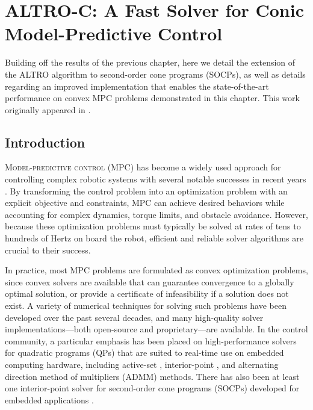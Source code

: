 \documentclass[../root.tex]{subfiles}
\begin{document}
\chapter{ALTRO-C: A Fast Solver for Conic Model-Predictive Control} \label{chap:altro_c}
Building off the results of the previous chapter, here we detail the extension of the
ALTRO algorithm to second-order cone programs (SOCPs), as well as details regarding
an improved implementation that enables the state-of-the-art performance on convex 
MPC problems demonstrated in this chapter. 
This work originally appeared in \cite{jackson_ALTROC_2021}.

\section{Introduction}
    \lettrine{M}{odel-predictive control} 
    (MPC) has become a widely used approach for
    controlling complex robotic systems with several notable successes in
    recent years
    \cite{blackmore_Autonomous_2016,kuindersma_Optimizationbased_2016,carlo_Dynamic_2018}.
    By transforming the control problem into an optimization problem with an
    explicit objective and constraints, MPC can achieve desired behaviors
    while accounting for complex dynamics, torque limits, and obstacle
    avoidance. However, because these optimization problems must typically be
    solved at rates of tens to hundreds of Hertz on board the robot,
    efficient and reliable solver algorithms are crucial to their success.
    
    In practice, most MPC problems are formulated as convex optimization
    problems, since convex solvers are available that can guarantee
    convergence to a globally optimal solution, or provide a certificate of
    infeasibility if a solution does not exist. A variety of numerical
    techniques for solving such problems have been developed over the past
    several decades, and many high-quality solver implementations---both
    open-source and proprietary---are available. In the control community, a
    particular emphasis has been placed on high-performance solvers for
    quadratic programs (QPs) that are suited to real-time use on embedded
    computing hardware, including active-set \cite{ferreau_qpOASES_2014}
    \cite{kuindersma_efficiently_2014}, interior-point
    \cite{frison_Efficient_2014,frison_Highperformance_2014, frison_HPIPM_2020}, 
    and alternating
    direction method of multipliers (ADMM) \cite{stellato_OSQP_2020} methods. There has
    also been at least one interior-point solver for second-order cone
    programs (SOCPs) developed for embedded applications \cite{domahidi_ECOS_2013}.
   
\end{document}
